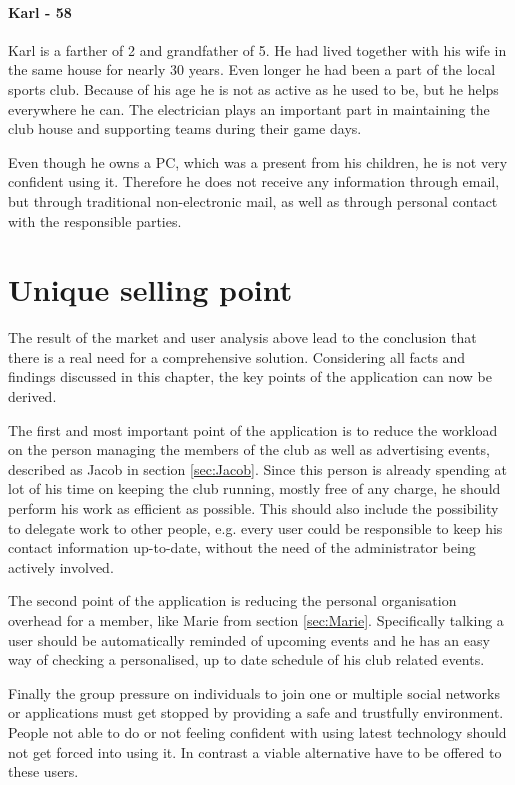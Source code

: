 \paragraph{Karl - 58}
Karl is a farther of 2 and grandfather of 5. He had lived together with his wife in the same house for nearly 30 years. Even longer he had been a part of the local sports club. Because of his age he is not as active as he used to be, but he helps everywhere he can. The electrician plays an important part in maintaining the club house and supporting teams during their game days.

Even though he owns a PC, which was a present from his children, he is not very confident using it. Therefore he does not receive any information through email, but through traditional non-electronic mail, as well as through personal contact with the responsible parties.  

\section{Unique selling point}
\label{sec:SellingPoint}

The result of the market and user analysis above lead to the conclusion that there is a real need for a comprehensive solution. Considering all facts and findings discussed in this chapter, the key points of the application can now be derived. 

The first and most important point of the application is to reduce the workload on the person managing the members of the club as well as advertising events, described as Jacob in section \vref{sec:Jacob}. Since this person is already spending at lot of his time on keeping the club running, mostly free of any charge, he should perform his work as efficient as possible. This should also include the possibility to delegate work to other people, e.g. every user could be responsible to keep his contact information up-to-date, without the need of the administrator being actively involved.

The second point of the application is reducing the personal organisation overhead for a member, like Marie from section \vref{sec:Marie}. Specifically talking a user should be automatically reminded of upcoming events and he has an easy way of checking a personalised, up to date schedule of his club related events.

Finally the group pressure on individuals to join one or multiple social networks or applications must get stopped by providing a safe and trustfully environment. People not able to do or not feeling confident with using latest technology should not get forced into using it. In contrast a viable alternative have to be offered to these users. 

